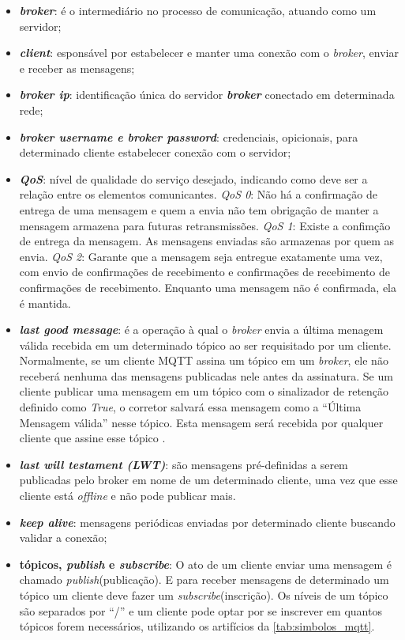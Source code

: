 \begin{itemize}
	\item \textbf{\textit{broker}}: é o intermediário no processo de comunicação, atuando como um servidor;
	\item \textbf{\textit{client}}: esponsável por estabelecer e manter uma conexão com o \textit{broker}, enviar e receber as mensagens;
	\item \textit{\textbf{broker ip}}: identificação única do servidor \textit{\textbf{broker}} conectado em determinada rede;
	\item \textbf{\textit{broker username e broker password}}: credenciais, opicionais, para determinado cliente estabelecer conexão com o servidor; 
	\item  \textit{\textbf{QoS}}: nível de qualidade do serviço desejado, indicando como deve ser a relação entre os elementos comunicantes. \textit{QoS 0}: Não há a confirmação de entrega de uma mensagem e quem a envia não tem obrigação de manter a mensagem armazena para futuras retransmissões. \textit{QoS 1}: Existe a confimção de entrega da mensagem. As mensagens enviadas são armazenas por quem as envia. \textit{QoS 2}: Garante que a mensagem seja entregue exatamente uma vez, com envio de confirmações de recebimento e confirmações de recebimento de confirmações de recebimento. Enquanto uma mensagem não é confirmada, ela é mantida.\cite{fabiobrandao}
	
	\item \textbf{\textit{last good message}}: é a operação à qual o \textit{broker} envia a última menagem válida recebida em um determinado tópico ao ser requisitado por um cliente. Normalmente, se um cliente MQTT assina um tópico em um \textit{broker}, ele não receberá nenhuma das mensagens publicadas nele antes da assinatura. Se um cliente publicar uma mensagem em um tópico com o sinalizador de retenção definido como \textit{True}, o corretor salvará essa mensagem como a “Última Mensagem válida” nesse tópico. Esta mensagem será recebida por qualquer cliente que assine esse tópico \cite{mntolia}. 
	
	\item \textbf{\textit{last will testament (LWT)}}: são mensagens pré-definidas a serem publicadas pelo broker em nome de um determinado cliente, uma vez que esse cliente está \textit{offline} e não pode publicar mais.
	\item \textbf{\textit{keep alive}}: mensagens periódicas enviadas por determinado cliente buscando validar a conexão;
	\item \textbf{tópicos, \textit{publish} e \textit{subscribe}}: O ato de um cliente enviar uma mensagem é chamado \textit{publish}(publicação). E para receber mensagens de determinado um tópico um cliente deve fazer um \textit{subscribe}(inscrição). Os níveis de um tópico são separados por “/” e um cliente pode optar por se inscrever em quantos tópicos forem necessários, utilizando os artifícios da \autoref{tab:simbolos_mqtt}.
	
\end{itemize}

